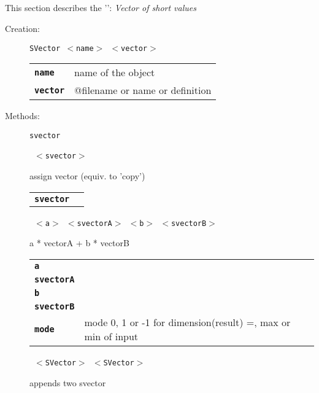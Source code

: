 
\subsection{}

This section describes the '': \textsl{Vector of short values}

\begin{description}

  \item[Creation:] \texttt{SVector  $<$name$>$ $<$vector$>$}


      \begin{tabular}{ll}
 \texttt{\textbf{name}} &    name of the object \\
 \texttt{\textbf{vector}} & @filename or name or definition \\
      \end{tabular}

\vspace{3mm} \item[Methods:] \texttt{svector}

    \begin{description}
       \texttt{ $<$svector$>$} \

        assign vector (equiv. to 'copy')

      \begin{tabular}{ll}
 \texttt{\textbf{svector}} &  \\
      \end{tabular}
       \texttt{ $<$a$>$ $<$svectorA$>$ $<$b$>$ $<$svectorB$>$ } \

        a * vectorA + b * vectorB

      \begin{tabular}{ll}
 \texttt{\textbf{a}} &           \\
 \texttt{\textbf{svectorA}} &  \\
 \texttt{\textbf{b}} &           \\
 \texttt{\textbf{svectorB}} &  \\
 \texttt{\textbf{mode}} &       mode 0, 1 or -1 for dimension(result) =, max or min of input  \\
      \end{tabular}
       \texttt{ $<$SVector$>$ $<$SVector$>$} \

        appends two svector


\end{description}
\end{description}
